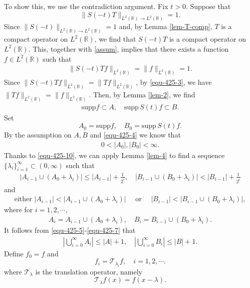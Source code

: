 \documentclass[preprint,12pt]{elsarticle}
\def\R {\mathbb{R}}
\begin{document}
To show this, we use the contradiction argument. Fix $t>0$. Suppose that
\begin{equation}\label{assum}
    \|S(-t) T \|_{L^2(\R)\to L^2(\R)}=1.
\end{equation}
Since $\|S(-t)\|_{L^2(\R)\to L^2(\R)}=1$ and, by Lemma \ref{lem-T-comp}, $T$ is a compact operator on $L^2(\R)$, we find that $S(-t)T$ is a compact operator on  $L^2(\R)$. This, together with \eqref{assum}, implies that there exists a function $f\in L^2(\R)$ such that
\begin{align}\label{equ-425-3}
\|S(-t)Tf\|_{L^2(\R)}=\|f\|_{L^2(\R)}=1.
\end{align}
Since $\|S(-t)Tf\|_{L^2(\R)}=\|Tf\|_{L^2(\R)}$, by \eqref{equ-425-3}, we have $\|Tf\|_{L^2(\R)}=\|f\|_{L^2(\R)}$. Then, by Lemma \ref{lem-2}, we find
\begin{align}\label{equ-425-4}
\mathrm{supp } f\subset A, \quad \mathrm{supp }\,  S(t)f\subset B.
\end{align}
Set
$$
A_0=\mathrm{supp } f, \quad B_0=\mathrm{supp }\,  S(t)f.
$$
By the assumption on $A,B$ and \eqref{equ-425-4} we know that
\begin{align}\label{equ-425-10}
0<|A_0|, |B_0|<\infty.
\end{align}
Thanks to \eqref{equ-425-10}, we can apply Lemma \ref{lem-4} to find a sequence $\{\lambda_i\}_{i=1}^\infty\subset(0,\infty)$ such that
\begin{align}\label{equ-425-5}
|A_{i-1}\cup (A_0+\lambda_i)|\leq |A_{i-1}|+\frac{1}{2^i}, \quad   |B_{i-1}\cup (B_0+\lambda_i)|<|B_{i-1}|+\frac{1}{2^i}
\end{align}
and
\begin{align}\label{equ-425-6}
\mbox{either } |A_{i-1}|< |A_{i-1}\cup (A_0+\lambda_i)|  \quad  \mbox{ or } \quad |B_{i-1}|< |B_{i-1}\cup (B_0+\lambda_i)|,
\end{align}
where for $i=1,2,\cdots,$
\begin{align}\label{equ-425-7}
A_i=A_{i-1}\cup  (A_0+\lambda_i), \quad B_i=B_{i-1}\cup (B_0+\lambda_i).
\end{align}
It follows from \eqref{equ-425-5}-\eqref{equ-425-7} that
\begin{align}\label{equ-425-8}
|\bigcup_{i=0}^{\infty}A_i|\leq |A|+1,\quad |\bigcup_{i=0}^{\infty}B_i|\leq|B|+1.
\end{align}
Define $f_0=f$ and
$$
f_i=\mathcal{T}_{\lambda_i}f, \quad i=1,2,\cdots.
$$
where $\mathcal{T}_\lambda$ is the translation operator, namely
\begin{equation*}
    \mathcal{T}_{\lambda}f(x)=f(x-\lambda).
\end{equation*}
\end{document}
